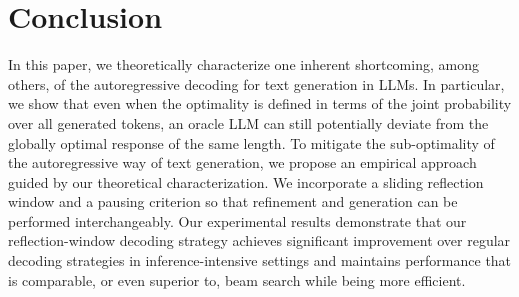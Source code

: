 \section{Conclusion}
In this paper, we theoretically characterize one inherent shortcoming, among others, of the autoregressive decoding for text generation in LLMs.
In particular, we show that even when the optimality is defined in terms of the joint probability over all generated tokens, an oracle LLM can still potentially deviate from the globally optimal response of the same length.
To mitigate the sub-optimality of the autoregressive way of text generation, we propose an empirical approach guided by our theoretical characterization.
We incorporate a sliding reflection window and a pausing criterion so that refinement and generation can be performed interchangeably.
Our experimental results demonstrate that our reflection-window decoding strategy achieves significant improvement over regular decoding strategies in inference-intensive settings and maintains performance that is comparable, or even superior to, beam search while being more efficient.
